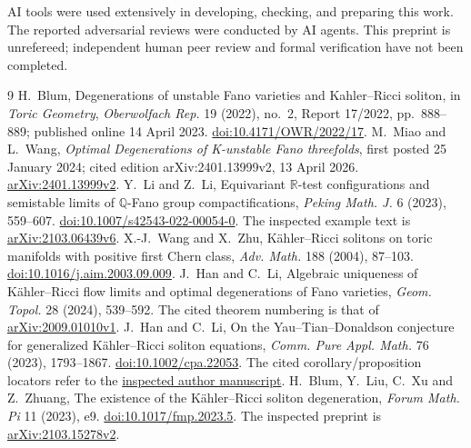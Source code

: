 \documentclass[11pt,a4paper]{article}
\begin{document}
AI tools were used extensively in developing, checking, and preparing this
work. The reported adversarial reviews were conducted by AI agents.
This preprint is unrefereed; independent human peer review and formal
verification have not been completed.

\begin{thebibliography}{9}
H.~Blum, Degenerations of unstable Fano varieties and Kahler--Ricci soliton,
in \emph{Toric Geometry}, \emph{Oberwolfach Rep.} 19 (2022), no.~2,
Report 17/2022, pp.~888--889; published online 14 April 2023.
\href{https://doi.org/10.4171/OWR/2022/17}{doi:10.4171/OWR/2022/17}.
M.~Miao and L.~Wang, \emph{Optimal Degenerations of K-unstable Fano
threefolds}, first posted 25 January 2024; cited edition
arXiv:2401.13999v2, 13 April 2026.
\href{https://arxiv.org/abs/2401.13999v2}{arXiv:2401.13999v2}.
Y.~Li and Z.~Li, Equivariant \(\mathbb R\)-test configurations and
semistable limits of \(\mathbb Q\)-Fano group compactifications,
\emph{Peking Math. J.} 6 (2023), 559--607.
\href{https://doi.org/10.1007/s42543-022-00054-0}{doi:10.1007/s42543-022-00054-0}.
The inspected example text is
\href{https://arxiv.org/abs/2103.06439v6}{arXiv:2103.06439v6}.
X.-J.~Wang and X.~Zhu, Kähler--Ricci solitons on toric manifolds with
positive first Chern class, \emph{Adv. Math.} 188 (2004), 87--103.
\href{https://doi.org/10.1016/j.aim.2003.09.009}{doi:10.1016/j.aim.2003.09.009}.
J.~Han and C.~Li, Algebraic uniqueness of Kähler--Ricci flow limits
and optimal degenerations of Fano varieties,
\emph{Geom. Topol.} 28 (2024), 539--592.
The cited theorem numbering is that of
\href{https://arxiv.org/abs/2009.01010v1}{arXiv:2009.01010v1}.
J.~Han and C.~Li, On the Yau--Tian--Donaldson conjecture for
generalized Kähler--Ricci soliton equations,
\emph{Comm. Pure Appl. Math.} 76 (2023), 1793--1867.
\href{https://doi.org/10.1002/cpa.22053}{doi:10.1002/cpa.22053}.
The cited corollary/proposition locators refer to the
\href{https://sites.math.rutgers.edu/~cl1412/papers/g-soliton.pdf}{inspected author manuscript}.
H.~Blum, Y.~Liu, C.~Xu and Z.~Zhuang, The existence of the
Kähler--Ricci soliton degeneration,
\emph{Forum Math. Pi} 11 (2023), e9.
\href{https://doi.org/10.1017/fmp.2023.5}{doi:10.1017/fmp.2023.5}.
The inspected preprint is
\href{https://arxiv.org/abs/2103.15278v2}{arXiv:2103.15278v2}.
\end{thebibliography}
\end{document}
